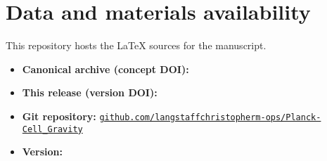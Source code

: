 \section*{Data and materials availability}
This repository hosts the \LaTeX{} sources for the manuscript.

\begin{itemize}
  \item \textbf{Canonical archive (concept DOI):}
  \href{https://doi.org/\RepoConceptDOI}{\RepoConceptDOI}

  \item \textbf{This release (version DOI):}
  \href{https://doi.org/\PaperDOI}{\PaperDOI}

  \item \textbf{Git repository:}
  \href{\RepoGitHubURL}{\texttt{github.com/langstaffchristopherm-ops/Planck-Cell\_Gravity}}

  \item \textbf{Version:} \PaperVersion
\end{itemize}